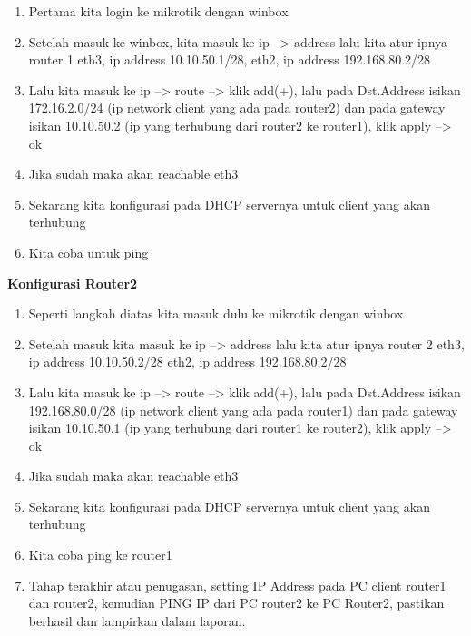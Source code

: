 	\begin{enumerate}
		\item Pertama kita login ke mikrotik dengan winbox
		\item Setelah masuk ke winbox, kita masuk ke ip --> address lalu kita atur ipnya router 1 eth3, ip address 10.10.50.1/28, eth2, ip address 192.168.80.2/28
		\item Lalu kita masuk ke ip --> route --> klik add(+), lalu pada Dst.Address isikan 172.16.2.0/24 (ip network client yang ada pada router2) dan pada gateway isikan 10.10.50.2 (ip yang terhubung dari router2 ke router1), klik apply --> ok
		\item Jika sudah maka akan reachable eth3
		\item Sekarang kita konfigurasi pada DHCP servernya untuk client yang akan terhubung
		\item Kita coba untuk ping
	\end{enumerate}
\begin{center}
	\textbf{Konfigurasi Router2}
\end{center}
	\begin{enumerate}
		\item Seperti langkah diatas kita masuk dulu ke mikrotik dengan winbox
		\item Setelah masuk kita masuk ke ip --> address lalu kita atur ipnya router 2 eth3, ip address 10.10.50.2/28 eth2, ip address 192.168.80.2/28
		\item Lalu kita masuk ke ip --> route --> klik add(+), lalu pada Dst.Address isikan 192.168.80.0/28 (ip network client yang ada pada router1) dan pada gateway isikan 10.10.50.1 (ip yang terhubung dari router1 ke router2), klik apply --> ok
		\item Jika sudah maka akan reachable eth3
		\item Sekarang kita konfigurasi pada DHCP servernya untuk client yang akan terhubung
		\item Kita coba ping ke router1
		\item Tahap terakhir atau penugasan, setting IP Address pada PC client router1 dan router2, kemudian PING IP dari PC router2 ke PC Router2, pastikan berhasil dan lampirkan dalam laporan.
	\end{enumerate}

